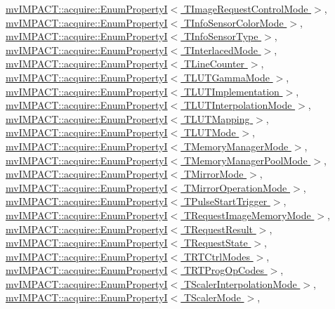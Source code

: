 \hyperlink{classmv_i_m_p_a_c_t_1_1acquire_1_1_enum_property_i}{mv\+I\+M\+P\+A\+C\+T\+::acquire\+::\+Enum\+Property\+I$<$ T\+Image\+Request\+Control\+Mode $>$}, \hyperlink{classmv_i_m_p_a_c_t_1_1acquire_1_1_enum_property_i}{mv\+I\+M\+P\+A\+C\+T\+::acquire\+::\+Enum\+Property\+I$<$ T\+Info\+Sensor\+Color\+Mode $>$}, \hyperlink{classmv_i_m_p_a_c_t_1_1acquire_1_1_enum_property_i}{mv\+I\+M\+P\+A\+C\+T\+::acquire\+::\+Enum\+Property\+I$<$ T\+Info\+Sensor\+Type $>$}, \hyperlink{classmv_i_m_p_a_c_t_1_1acquire_1_1_enum_property_i}{mv\+I\+M\+P\+A\+C\+T\+::acquire\+::\+Enum\+Property\+I$<$ T\+Interlaced\+Mode $>$}, \hyperlink{classmv_i_m_p_a_c_t_1_1acquire_1_1_enum_property_i}{mv\+I\+M\+P\+A\+C\+T\+::acquire\+::\+Enum\+Property\+I$<$ T\+Line\+Counter $>$}, \hyperlink{classmv_i_m_p_a_c_t_1_1acquire_1_1_enum_property_i}{mv\+I\+M\+P\+A\+C\+T\+::acquire\+::\+Enum\+Property\+I$<$ T\+L\+U\+T\+Gamma\+Mode $>$}, \hyperlink{classmv_i_m_p_a_c_t_1_1acquire_1_1_enum_property_i}{mv\+I\+M\+P\+A\+C\+T\+::acquire\+::\+Enum\+Property\+I$<$ T\+L\+U\+T\+Implementation $>$}, \hyperlink{classmv_i_m_p_a_c_t_1_1acquire_1_1_enum_property_i}{mv\+I\+M\+P\+A\+C\+T\+::acquire\+::\+Enum\+Property\+I$<$ T\+L\+U\+T\+Interpolation\+Mode $>$}, \hyperlink{classmv_i_m_p_a_c_t_1_1acquire_1_1_enum_property_i}{mv\+I\+M\+P\+A\+C\+T\+::acquire\+::\+Enum\+Property\+I$<$ T\+L\+U\+T\+Mapping $>$}, \hyperlink{classmv_i_m_p_a_c_t_1_1acquire_1_1_enum_property_i}{mv\+I\+M\+P\+A\+C\+T\+::acquire\+::\+Enum\+Property\+I$<$ T\+L\+U\+T\+Mode $>$}, \hyperlink{classmv_i_m_p_a_c_t_1_1acquire_1_1_enum_property_i}{mv\+I\+M\+P\+A\+C\+T\+::acquire\+::\+Enum\+Property\+I$<$ T\+Memory\+Manager\+Mode $>$}, \hyperlink{classmv_i_m_p_a_c_t_1_1acquire_1_1_enum_property_i}{mv\+I\+M\+P\+A\+C\+T\+::acquire\+::\+Enum\+Property\+I$<$ T\+Memory\+Manager\+Pool\+Mode $>$}, \hyperlink{classmv_i_m_p_a_c_t_1_1acquire_1_1_enum_property_i}{mv\+I\+M\+P\+A\+C\+T\+::acquire\+::\+Enum\+Property\+I$<$ T\+Mirror\+Mode $>$}, \hyperlink{classmv_i_m_p_a_c_t_1_1acquire_1_1_enum_property_i}{mv\+I\+M\+P\+A\+C\+T\+::acquire\+::\+Enum\+Property\+I$<$ T\+Mirror\+Operation\+Mode $>$}, \hyperlink{classmv_i_m_p_a_c_t_1_1acquire_1_1_enum_property_i}{mv\+I\+M\+P\+A\+C\+T\+::acquire\+::\+Enum\+Property\+I$<$ T\+Pulse\+Start\+Trigger $>$}, \hyperlink{classmv_i_m_p_a_c_t_1_1acquire_1_1_enum_property_i}{mv\+I\+M\+P\+A\+C\+T\+::acquire\+::\+Enum\+Property\+I$<$ T\+Request\+Image\+Memory\+Mode $>$}, \hyperlink{classmv_i_m_p_a_c_t_1_1acquire_1_1_enum_property_i}{mv\+I\+M\+P\+A\+C\+T\+::acquire\+::\+Enum\+Property\+I$<$ T\+Request\+Result $>$}, \hyperlink{classmv_i_m_p_a_c_t_1_1acquire_1_1_enum_property_i}{mv\+I\+M\+P\+A\+C\+T\+::acquire\+::\+Enum\+Property\+I$<$ T\+Request\+State $>$}, \hyperlink{classmv_i_m_p_a_c_t_1_1acquire_1_1_enum_property_i}{mv\+I\+M\+P\+A\+C\+T\+::acquire\+::\+Enum\+Property\+I$<$ T\+R\+T\+Ctrl\+Modes $>$}, \hyperlink{classmv_i_m_p_a_c_t_1_1acquire_1_1_enum_property_i}{mv\+I\+M\+P\+A\+C\+T\+::acquire\+::\+Enum\+Property\+I$<$ T\+R\+T\+Prog\+Op\+Codes $>$}, \hyperlink{classmv_i_m_p_a_c_t_1_1acquire_1_1_enum_property_i}{mv\+I\+M\+P\+A\+C\+T\+::acquire\+::\+Enum\+Property\+I$<$ T\+Scaler\+Interpolation\+Mode $>$}, \hyperlink{classmv_i_m_p_a_c_t_1_1acquire_1_1_enum_property_i}{mv\+I\+M\+P\+A\+C\+T\+::acquire\+::\+Enum\+Property\+I$<$ T\+Scaler\+Mode $>$}, 